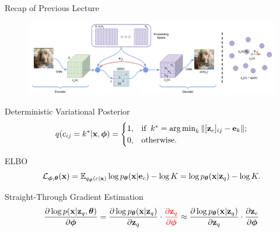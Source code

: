 \documentclass{beamer}
\begin{document}
\begin{frame}{Recap of Previous Lecture}
	\begin{figure}
		\centering
		\includegraphics[width=0.85\linewidth]{figs/vqvae}
	\end{figure}
	\vspace{-0.3cm}
	\begin{block}{Deterministic Variational Posterior}
		\vspace{-0.3cm}
		\[
			q(c_{ij} = k^* | \mathbf{x}, \boldsymbol{\phi}) = \begin{cases}
				1,  & \text{if}\;\; k^* = \operatorname*{arg\,min}_k \| [\mathbf{z}_e]_{ij} - \mathbf{e}_k \|; \\
				0,  & \text{otherwise}.
			\end{cases}
		\]
		\vspace{-0.5cm}
	\end{block}
	\begin{block}{ELBO}
		\vspace{-0.6cm}
		\[
			\mathcal{L}_{\boldsymbol{\phi}, \boldsymbol{\theta}}(\mathbf{x})  = \mathbb{E}_{q_{\boldsymbol{\phi}}(c| \mathbf{x})} \log p_{\boldsymbol{\theta}}(\mathbf{x}| \mathbf{e}_{c}) - \log K =  \log p_{\boldsymbol{\theta}}(\mathbf{x}| \mathbf{z}_q) - \log K.
		\]
		\vspace{-0.6cm}
	\end{block}
	\begin{block}{Straight-Through Gradient Estimation}
		\vspace{-0.6cm}
		\[
			\frac{\partial \log p(\mathbf{x} | \mathbf{z}_q , \boldsymbol{\theta})}{\partial \boldsymbol{\phi}} = \frac{\partial \log p_{\boldsymbol{\theta}}(\mathbf{x}| \mathbf{z}_q)}{\partial \mathbf{z}_q} \cdot {\color{red}\frac{\partial \mathbf{z}_q}{\partial \boldsymbol{\phi}}} \approx \frac{\partial \log p_{\boldsymbol{\theta}}(\mathbf{x}| \mathbf{z}_q)}{\partial \mathbf{z}_q} \cdot \frac{\partial \mathbf{z}_e}{\partial \boldsymbol{\phi}}
		\]
	\end{block}
\end{frame}
\end{document}
